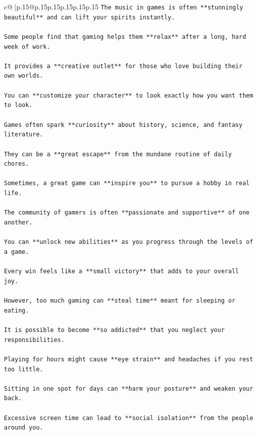 \documentclass{article}
\begin{document}
{\begin{supertabular}{c@{$\;$}|p{.15\linewidth}@{}p{.15\linewidth}p{.15\linewidth}p{.15\linewidth}p{.15\linewidth}p{.15\linewidth}}
{{{\texttt{The music in games is often **stunningly beautiful** and can lift your spirits instantly.} \\
\\ 
\texttt{Some people find that gaming helps them **relax** after a long, hard week of work.} \\
\\ 
\texttt{It provides a **creative outlet** for those who love building their own worlds.} \\
\\ 
\texttt{You can **customize your character** to look exactly how you want them to look.} \\
\\ 
\texttt{Games often spark **curiosity** about history, science, and fantasy literature.} \\
\\ 
\texttt{They can be a **great escape** from the mundane routine of daily chores.} \\
\\ 
\texttt{Sometimes, a great game can **inspire you** to pursue a hobby in real life.} \\
\\ 
\texttt{The community of gamers is often **passionate and supportive** of one another.} \\
\\ 
\texttt{You can **unlock new abilities** as you progress through the levels of a game.} \\
\\ 
\texttt{Every win feels like a **small victory** that adds to your overall joy.} \\
\\ 
\texttt{However, too much gaming can **steal time** meant for sleeping or eating.} \\
\\ 
\texttt{It is possible to become **so addicted** that you neglect your responsibilities.} \\
\\ 
\texttt{Playing for hours might cause **eye strain** and headaches if you rest too little.} \\
\\ 
\texttt{Sitting in one spot for days can **harm your posture** and weaken your back.} \\
\\ 
\texttt{Excessive screen time can lead to **social isolation** from the people around you.} \\
\\ 
}}}
\end{supertabular}}
\end{document}
